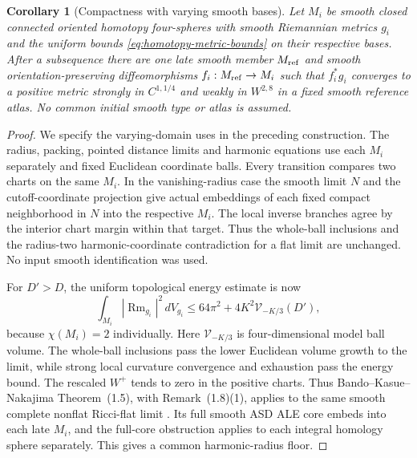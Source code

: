 \documentclass[11pt]{article}
\numberwithin{equation}{section}
\newtheorem{corollary}[theorem]{Corollary}
\theoremstyle{definition}
\theoremstyle{remark}
\begin{document}
\begin{corollary}[Compactness with varying smooth bases]
\label{cor:varying-homotopy-metric-compactness}
Let $M_i$ be smooth closed connected oriented homotopy
four-spheres with smooth Riemannian metrics $g_i$ and the uniform bounds
\eqref{eq:homotopy-metric-bounds} on their respective bases.
After a subsequence there are one late smooth member
$M_{\rm ref}$ and smooth orientation-preserving diffeomorphisms
$f_i:M_{\rm ref}\to M_i$ such that $f_i^*g_i$ converges to a
positive metric strongly in $C^{1,1/4}$ and weakly in $W^{2,8}$
in a fixed smooth reference atlas. No common initial smooth
type or atlas is assumed.
\end{corollary}
\begin{proof}
We specify the varying-domain uses in the preceding construction.
The radius, packing, pointed distance limits and harmonic equations
use each $M_i$ separately and fixed Euclidean coordinate balls.
Every transition compares two charts on the same $M_i$.
In the vanishing-radius case the smooth limit $N$ and the
cutoff-coordinate projection give actual embeddings of each
fixed compact neighborhood in $N$ into the respective $M_i$.
The local inverse branches agree by the interior chart margin
within that target. Thus the whole-ball inclusions and the
radius-two harmonic-coordinate contradiction for a flat limit
are unchanged. No input smooth identification was used.

For $D'>D$, the uniform topological energy estimate is now
\[
 \int_{M_i}|\operatorname{Rm}_{g_i}|^2\,dV_{g_i}
       \le64\pi^2+4K^2\mathcal V_{-K/3}(D'),
\]
because $\chi(M_i)=2$ individually. Here $\mathcal V_{-K/3}$
is four-dimensional model ball volume. The whole-ball inclusions
pass the lower Euclidean volume growth to the limit, while strong
local curvature convergence and exhaustion pass the energy bound.
The rescaled $W^+$ tends to zero in the positive charts.
Thus Bando--Kasue--Nakajima Theorem~(1.5), with Remark~(1.8)(1),
applies to the same smooth complete nonflat Ricci-flat limit
\cite[pp.~314--315]{BandoKasueNakajima1989Coordinates}.
Its full smooth ASD ALE core embeds into each late $M_i$,
and the full-core obstruction applies to each integral homology
sphere separately. This gives a common harmonic-radius floor.


\end{proof}
\end{document}
